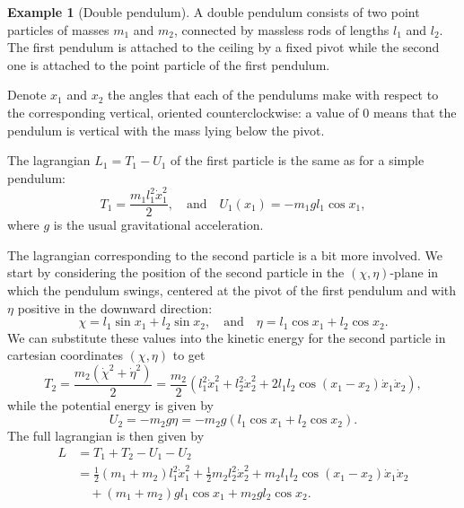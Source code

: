\documentclass[english,fontsize=11pt,paper=b5]{scrbook}
\theoremstyle{definition}
\newtheorem{example}{Example}[chapter]
\begin{document}
    \begin{example}[Double pendulum]\label{ex:2pendulum}
      A double pendulum consists of two point particles of masses $m_1$ and $m_2$, connected by massless rods of lengths $l_1$ and $l_2$. The first pendulum is attached to the ceiling by a fixed pivot while the second one is attached to the point particle of the first pendulum.

      Denote $x_1$ and $x_2$ the angles that each of the pendulums make with respect to the corresponding vertical, oriented counterclockwise: a value of $0$ means that the pendulum is vertical with the mass lying below the pivot.

      The lagrangian $L_1 = T_1 - U_1$ of the first particle is the same as for a simple pendulum:
      \begin{equation}
        T_1 = \frac{m_1 l_1^2 \dot x_1^2}2,
        \quad\mbox{and}\quad
        U_1(x_1) = -m_1 g l_1 \cos x_1,
      \end{equation}
      where $g$ is the usual gravitational acceleration.

      The lagrangian corresponding to the second particle is a bit more involved. We start by considering the position of the second particle in the $(\chi,\eta)$-plane in which the pendulum swings, centered at the pivot of the first pendulum and with $\eta$ positive in the downward direction:
      \begin{equation}
        \chi = l_1\sin x_1 + l_2\sin x_2,
        \quad\mbox{and}\quad
        \eta = l_1\cos x_1 + l_2\cos x_2.
      \end{equation}
      We can substitute these values into the kinetic energy for the second particle in cartesian coordinates $(\chi,\eta)$ to get
      \begin{equation}
        T_2 = \frac {m_2 (\dot\chi^2 + \dot\eta^2)}2
        = \frac {m_2}2 \left(
          l_1^2 \dot x_1^2 + l_2^2 \dot x_2^2
          + 2l_1l_2 \cos(x_1 -x_2)\dot x_1 \dot x_2
        \right),
      \end{equation}
      while the potential energy is given by
      \begin{equation}
        U_2 = -m_2 g \eta = -m_2g (l_1\cos x_1 + l_2\cos x_2).
      \end{equation}
      The full lagrangian is then given by
      \begin{align}
        L & = T_1 + T_2 - U_1 - U_2                 \\
          & = \frac12 (m_1 + m_2)  l_1^2 \dot x_1^2
          + \frac 12 m_2 l_2^2 \dot x_2^2
          + m_2l_1l_2 \cos(x_1 -x_2)\dot x_1 \dot x_2 \\
          & \quad+ (m_1 + m_2) g l_1 \cos x_1
          + m_2gl_2\cos x_2.
      \end{align}


\end{example}
\end{document}
